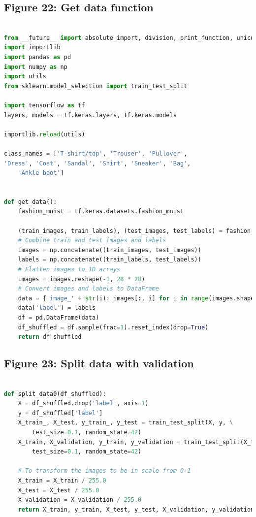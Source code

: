 \documentclass{article}
\begin{document}
\subsection{Figure 22: Get data function}
\begin{lstlisting}[language=Python]
    
from __future__ import absolute_import, division, print_function, unicode_literals
import importlib
import pandas as pd
import numpy as np
import utils
from sklearn.model_selection import train_test_split

import tensorflow as tf
layers, models = tf.keras.layers, tf.keras.models

importlib.reload(utils)

class_names = ['T-shirt/top', 'Trouser', 'Pullover', 
'Dress', 'Coat', 'Sandal', 'Shirt', 'Sneaker', 'Bag',
    'Ankle boot']


def get_data():
    fashion_mnist = tf.keras.datasets.fashion_mnist

    (train_images, train_labels), (test_images, test_labels) = fashion_mnist.load_data()
    # Combine train and test images and labels
    images = np.concatenate((train_images, test_images))
    labels = np.concatenate((train_labels, test_labels))
    # Flatten images to 1D arrays
    images = images.reshape(-1, 28 * 28)
    # Convert images and labels to DataFrame
    data = {'image_' + str(i): images[:, i] for i in range(images.shape[1])}
    data['label'] = labels
    df = pd.DataFrame(data)
    df_shuffled = df.sample(frac=1).reset_index(drop=True)
    return df_shuffled
\end{lstlisting}

\subsection{Figure 23: Split data with validation}
\begin{lstlisting}[language=Python]
    
def split_data0(df_shuffled):
    X = df_shuffled.drop('label', axis=1)
    y = df_shuffled['label']
    X_train_, X_test, y_train_, y_test = train_test_split(X, y, \
        test_size=0.1, random_state=42)
    X_train, X_validation, y_train, y_validation = train_test_split(X_train_, y_train_,\
        test_size=0.1, random_state=42)

    # To transform the images to be in scale from 0-1
    X_train = X_train / 255.0
    X_test = X_test / 255.0
    X_validation = X_validation / 255.0
    return X_train, y_train, X_test, y_test, X_validation, y_validation

\end{lstlisting}
\end{document}

